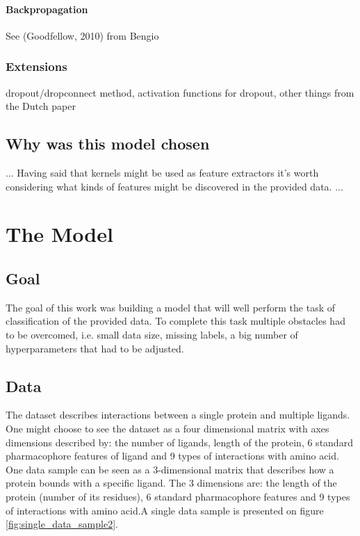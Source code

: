 \documentclass[a4paper,10pt]{report}
\begin{document}
	\subsubsection{Backpropagation} %
	  See (Goodfellow, 2010) from Bengio\\
	
      \subsection{Extensions} %
	dropout/dropconnect method, activation functions for dropout, other things from the Dutch paper\\
	
	
    \section{Why was this model chosen}
	... Having said that kernels might be used as feature extractors it's worth considering what kinds of features might be discovered in the provided data. ...\\
	
  \chapter{The Model} %
      
      \section{Goal}
      The goal of this work was building a model that will well perform the task of classification of the provided data. To complete this task multiple obstacles had to be overcomed, i.e. small data size, missing labels, a big number of hyperparameters that had to be adjusted.\\
     
	 
      
      \section{Data}
	The dataset describes interactions between a single protein and multiple ligands. One might choose to see the dataset as a four dimensional matrix with axes dimensions described by: the number of ligands, length of the protein, 6 standard pharmacophore features of ligand and 9 types of interactions with amino acid\cite{2DSIFT}. One data sample can be seen as a 3-dimensional matrix that describes how a protein bounds with a specific ligand. The 3 dimensions are: the length of the protein (number of its residues), 6 standard pharmacophore features and 9 types of interactions with amino acid.A single data sample is presented on figure \ref{fig:single_data_sample2}.\\
	
\end{document}
